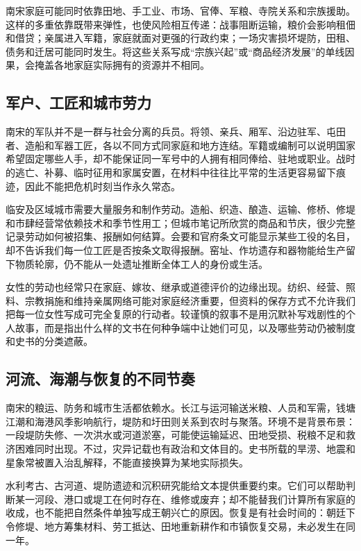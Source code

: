 南宋家庭可能同时依靠田地、手工业、市场、官俸、军粮、寺院关系和宗族援助。这样的多重依靠既带来弹性，也使风险相互传递：战事阻断运输，粮价会影响租佃和借贷；亲属进入军籍，家庭就面对更强的行政约束；一场灾害损坏堤防，田租、债务和迁居可能同时发生。将这些关系写成“宗族兴起”或“商品经济发展”的单线因果，会掩盖各地家庭实际拥有的资源并不相同。

\subsection{军户、工匠和城市劳力}

南宋的军队并不是一群与社会分离的兵员。将领、亲兵、厢军、沿边驻军、屯田者、造船和军器工匠，各以不同方式同家庭和地方连结。军籍或编制可以说明国家希望固定哪些人手，却不能保证同一军号中的人拥有相同俸给、驻地或职业。战时的逃亡、补募、临时征用和家属安置，在材料中往往比平常的生活更容易留下痕迹，因此不能把危机时刻当作永久常态。

临安及区域城市需要大量服务和制作劳动。造船、织造、酿造、运输、修桥、修堤和市肆经营常依赖技术和季节性用工；但城市笔记所欣赏的商品和节庆，很少完整记录劳动如何被招集、报酬如何结算。会要和官府条文可能显示某些工役的名目，却不告诉我们每一位工匠是否按条文取得报酬。窑址、作坊遗存和器物能给生产留下物质轮廓，仍不能从一处遗址推断全体工人的身份或生活。

女性的劳动也经常只在家庭、嫁妆、继承或道德评价的边缘出现。纺织、经营、照料、宗教捐施和维持亲属网络可能对家庭经济重要，但资料的保存方式不允许我们把每一位女性写成可完全复原的行动者。较谨慎的叙事不是用沉默补写戏剧性的个人故事，而是指出什么样的文书在何种争端中让她们可见，以及哪些劳动仍被制度和史书的分类遮蔽。

\subsection{河流、海潮与恢复的不同节奏}

南宋的粮运、防务和城市生活都依赖水。长江与运河输送米粮、人员和军需，钱塘江潮和海港风季影响航行，堤防和圩田则关系到农时与聚落。环境不是背景布景：一段堤防失修、一次洪水或河道淤塞，可能使运输延迟、田地受损、税粮不足和救济困难同时出现。不过，灾异记载也有政治和文体目的。史书所载的旱涝、地震和星象常被置入治乱解释，不能直接换算为某地实际损失。

水利考古、古河道、堤防遗迹和沉积研究能给文本提供重要约束。它们可以帮助判断某一河段、港口或堤工在何时存在、维修或废弃；却不能替我们计算所有家庭的收成，也不能把自然条件单独写成王朝兴亡的原因。恢复是有社会时间的：朝廷下令修堤、地方筹集材料、劳工抵达、田地重新耕作和市镇恢复交易，未必发生在同一年。

